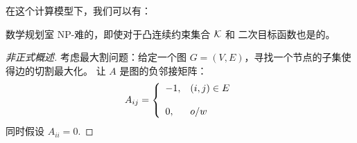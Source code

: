 在这个计算模型下，我们可以有：
\begin{lemma}
数学规划室 NP-难的，即使对于凸连续约束集合 $\mathcal K$ 和 二次目标函数也是的。
\end{lemma}
\begin{proof}[
非正式概述
]
考虑最大割问题：给定一个图 $G=(V,E)$，寻找一个节点的子集使得边的切割最大化。
让 $A$ 是图的负邻接矩阵：
$$ A_{ij} = { \left\{ \begin{array}{ll} {-1}, & {(i,j) \in E} \\\\ {0}, & {o/w} \end{array} \right. } $$
同时假设
$A_{ii} = 0$. 


\end{proof}
